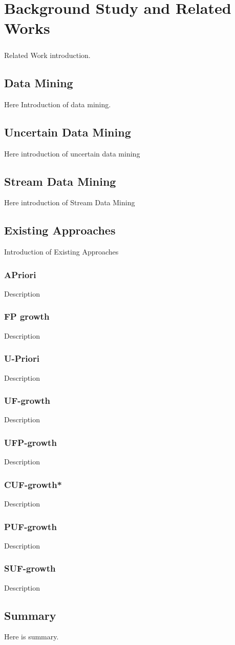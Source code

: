 \documentclass[a4paper,12pt]{book}
\begin{document}
\newpage

\chapter{Background Study and Related Works}
\paragraph{}
Related Work introduction.
\section{Data Mining}
Here Introduction of data mining.
\section{Uncertain Data Mining}
Here introduction of uncertain data mining
\section{Stream Data Mining}
Here introduction of Stream Data Mining
\section{Existing Approaches}
Introduction of Existing Approaches
\subsection{APriori}
Description
\subsection{FP growth}
Description
\subsection{U-Priori}
Description
\subsection{UF-growth}
Description
\subsection{UFP-growth}
Description
\subsection{CUF-growth*}
Description
\subsection{PUF-growth}
Description
\subsection{SUF-growth}
Description
\section{Summary}
Here is summary.
\end{document}
